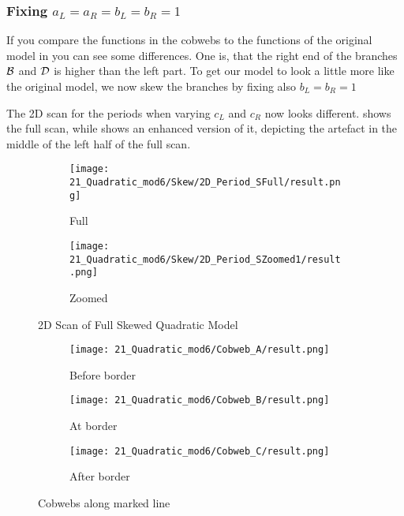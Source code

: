\subsubsection{Fixing $a_L = a_R = b_L = b_R = 1$}

If you compare the functions in the cobwebs  to the functions of the original model in  you can see some differences.
One is, that the right end of the branches $\mathcal{B}$ and $\mathcal{D}$ is higher than the left part.
To get our model to look a little more like the original model, we now skew the branches by fixing also $b_L = b_R = 1$

The 2D scan for the periods when varying $c_L$ and $c_R$ now looks different.
 shows the full scan, while  shows an enhanced version of it, depicting the artefact in the middle of the left half of the full scan.

\begin{figure}
    \centering
    \begin{subfigure}{0.4\textwidth}
        \centering
        \texttt{[image: 21\_Quadratic\_mod6/Skew/2D\_Period\_SFull/result.png]}
        \caption{Full}
        \label{fig:quadratic.full.skew.2d.full}
    \end{subfigure}
    \begin{subfigure}{0.4\textwidth}
        \centering
        \texttt{[image: 21\_Quadratic\_mod6/Skew/2D\_Period\_SZoomed1/result.png]}
        \caption{Zoomed}
        \label{fig:quadratic.full.skew.2d.z1}
    \end{subfigure}
    \caption{2D Scan of Full Skewed Quadratic Model}
\end{figure}



\begin{figure}
    \centering
    \begin{subfigure}{0.3\textwidth}
        \centering
        \texttt{[image: 21\_Quadratic\_mod6/Cobweb\_A/result.png]}
        \caption{Before border}
        \label{fig:quad.full.skew.CobwebA}
    \end{subfigure}
    \begin{subfigure}{0.3\textwidth}
        \centering
        \texttt{[image: 21\_Quadratic\_mod6/Cobweb\_B/result.png]}
        \caption{At border}
        \label{fig:quad.full.skew.CobwebB}
    \end{subfigure}
    \begin{subfigure}{0.3\textwidth}
        \centering
        \texttt{[image: 21\_Quadratic\_mod6/Cobweb\_C/result.png]}
        \caption{After border}
        \label{fig:quad.full.skew.CobwebC}
    \end{subfigure}
    \caption{Cobwebs along marked line}
    \label{fig:quad.full.skew.Cobwebs}
\end{figure}
